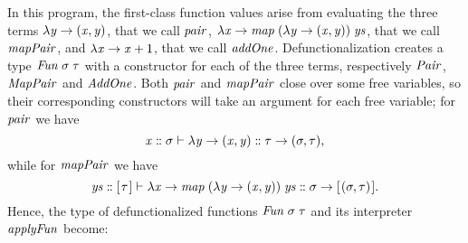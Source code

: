 In this program, the first-class function values arise from evaluating the three
terms \ensuremath{\lambda \Varid{y}\to (\Varid{x},\Varid{y})}, that we call \ensuremath{\Varid{pair}}, \ensuremath{\lambda \Varid{x}\to \Varid{map}\;(\lambda \Varid{y}\to (\Varid{x},\Varid{y}))\;\Varid{ys}},
that we call \ensuremath{\Varid{mapPair}}, and \ensuremath{\lambda \Varid{x}\to \Varid{x}\mathbin{+}\mathrm{1}}, that we call \ensuremath{\Varid{addOne}}.
Defunctionalization creates a type \ensuremath{\Conid{Fun}\;\sigma\;\tau} with a constructor for each
of the three terms, respectively \ensuremath{\Conid{Pair}}, \ensuremath{\Conid{MapPair}} and \ensuremath{\Conid{AddOne}}.
Both \ensuremath{\Varid{pair}} and \ensuremath{\Varid{mapPair}} close over some free variables, so their
corresponding constructors will take an argument
for each free variable; for \ensuremath{\Varid{pair}} we have
%
\[\mathit{x}\mathrel{:\mkern-1mu:}\sigma\vdash\lambda \mathit{y}\to (\mathit{x},\mathit{y})\mathrel{:\mkern-1mu:}\tau\to (\sigma,\tau),\]
%
while for \ensuremath{\Varid{mapPair}} we have
%
\[\mathit{ys}\mathrel{:\mkern-1mu:}[\mskip1.5mu \tau\mskip1.5mu]\vdash\lambda \mathit{x}\to \mathit{map}\;(\lambda \mathit{y}\to (\mathit{x},\mathit{y}))\;\mathit{ys}\mathrel{:\mkern-1mu:}\sigma\to [\mskip1.5mu (\sigma,\tau)\mskip1.5mu].\]
%
Hence, the type of defunctionalized functions \ensuremath{\Conid{Fun}\;\sigma\;\tau} and its
interpreter \ensuremath{\Varid{applyFun}} become:

